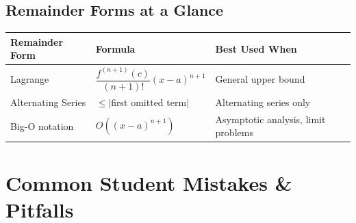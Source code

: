 \documentclass[12pt,a4paper]{article}
\begin{document}
\subsection*{Remainder Forms at a Glance}

\begin{center}
\begin{tabular}{lll}
\toprule
\textbf{Remainder Form} & \textbf{Formula} & \textbf{Best Used When} \\
\midrule
Lagrange & $\dfrac{f^{(n+1)}(c)}{(n+1)!}(x-a)^{n+1}$ & General upper bound \\[6pt]
Alternating Series & $\leq |$first omitted term$|$ & Alternating series only \\[6pt]
Big-O notation & $O((x-a)^{n+1})$ & Asymptotic analysis, limit problems \\
\bottomrule
\end{tabular}
\end{center}

\section{Common Student Mistakes \& Pitfalls}
\end{document}
